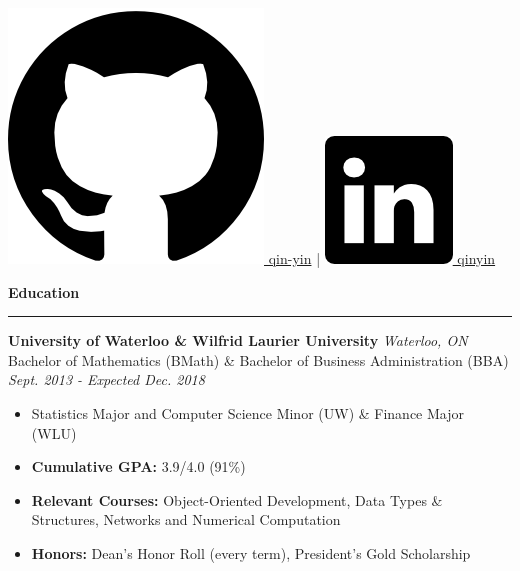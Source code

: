\documentclass{letter}
\begin{document}
\begin{center}
{			\href{https://github.com/qin-yin}{\includegraphics[scale=0.03]{icons/github.png} \hspace{0pt} qin-yin} \hspace{2pt} | \hspace{2pt} 
			\href{https://linkedin.com/in/qinyin}{\includegraphics[scale=0.055]{icons/linkedin.png} \hspace{1pt} qinyin}}
	\end{center}
	
	
	\begin{flushleft}
		{\Large \textbf{Education}}
		\rule[5pt]{\textwidth}{0.4pt}
		{\large \textbf{University of Waterloo \& Wilfrid Laurier University}} \hfill \textit{Waterloo, ON}\\
		Bachelor of Mathematics (BMath) \& Bachelor of Business Administration (BBA) \hfill \textit{Sept. 2013 - Expected Dec. 2018}
		\vspace{-7.5pt}
		\begin{itemize}
			\item Statistics Major and Computer Science Minor (UW) \& Finance Major (WLU) \vspace{-3pt}
			\item \textbf{Cumulative GPA:} 3.9/4.0 (91\%) \vspace{-3pt}
			\item \textbf{Relevant Courses:} Object-Oriented Development, Data Types \& Structures, Networks and Numerical Computation \vspace{-3pt}
			\item \textbf{Honors:} Dean's Honor Roll (every term), President's Gold Scholarship
		\end{itemize}
	\end{flushleft}
	
\end{document}
